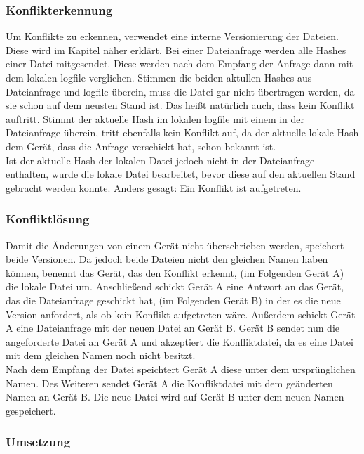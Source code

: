 \subsubsection{Konflikterkennung}\label{Konflikterkennung}
Um Konflikte zu erkennen, verwendet \sblit eine interne Versionierung der Dateien. Diese wird im Kapitel  näher erklärt. Bei einer Dateianfrage  werden alle Hashes einer Datei mitgesendet. Diese werden nach dem Empfang der Anfrage dann mit dem lokalen \gls{logfile} verglichen. Stimmen die beiden aktullen Hashes aus Dateianfrage und \gls{logfile} überein, muss die Datei gar nicht übertragen werden, da sie schon auf dem neusten Stand ist. Das heißt natürlich auch, dass kein Konflikt auftritt. Stimmt der aktuelle Hash im lokalen \gls{logfile} mit einem in der Dateianfrage überein, tritt ebenfalls kein Konflikt auf, da der aktuelle lokale Hash dem Gerät, dass die Anfrage verschickt hat, schon bekannt ist. \\
Ist der aktuelle Hash der lokalen Datei jedoch nicht in der Dateianfrage enthalten, wurde die lokale Datei bearbeitet, bevor diese auf den aktuellen Stand gebracht werden konnte. Anders gesagt: Ein Konflikt ist aufgetreten.

\subsubsection{Konfliktlösung}
Damit die Änderungen von einem Gerät nicht überschrieben werden, speichert \sblit beide Versionen. Da jedoch beide Dateien nicht den gleichen Namen haben können, benennt das Gerät, das den Konflikt erkennt, (im Folgenden Gerät A) die lokale Datei um. Anschließend schickt Gerät A eine Antwort an das Gerät, das die Dateianfrage geschickt hat,  (im Folgenden Gerät B) in der es die neue Version anfordert, als ob kein Konflikt aufgetreten wäre. Außerdem schickt Gerät A eine Dateianfrage mit der neuen Datei an Gerät B. Gerät B sendet nun die angeforderte Datei an Gerät A und akzeptiert die Konfliktdatei, da es eine Datei mit dem gleichen Namen noch nicht besitzt. \\
Nach dem Empfang der Datei speichtert Gerät A diese unter dem ursprünglichen Namen. Des Weiteren sendet Gerät A die Konfliktdatei mit dem geänderten Namen an Gerät B. Die neue Datei wird auf Gerät B unter dem neuen Namen gespeichert.

\subsubsection{Umsetzung}


